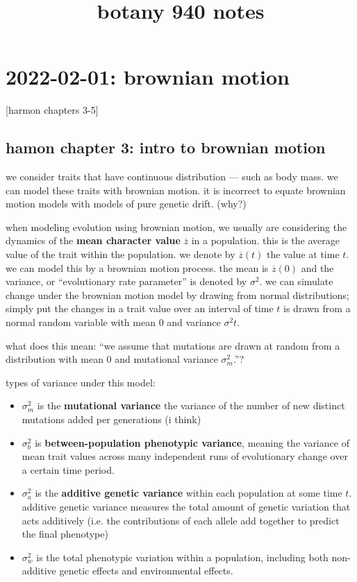 \documentclass{article}
\title{botany 940 notes}
\newcommand{\advar}{\sigma_{a}^{2}} %
\newcommand{\bvar}{\sigma_{b}^{2}}  %
\newcommand{\mvar}{\sigma_{m}^{2}}  %
\newcommand{\wvar}{\sigma_{w}^{2}}  %
\begin{document}
\maketitle

\section{2022-02-01: brownian motion}
[harmon chapters 3-5]

\subsection{hamon chapter 3: intro to brownian motion}
we consider traits that have continuous distribution --- such as body mass. we
can model these traits with brownian motion. it is incorrect to equate brownian
motion models with models of pure genetic drift. (why?)

when modeling evolution using brownian motion, we usually are considering the
dynamics of the \textbf{mean character value} $\overline{z}$ in a population.
this is the average value of the trait within the population. we denote by
$\overline{z}(t)$ the value at time $t$. we can model this by a brownian motion
process. the mean is $\overline{z}(0)$ and the variance, or ``evolutionary rate
parameter'' is denoted by $\sigma^{2}$. we can simulate change under the
brownian motion model by drawing from normal distributions; simply put the
changes in a trait value over an interval of time $t$ is drawn from a normal
random variable with mean 0 and variance $\sigma^{2}t$.


what does this mean: ``we assume that mutations are drawn at random from a
distribution with mean 0 and mutational variance $\sigma_{m}^{2}$.''?
\begin{definition}
types of variance under this model:
\begin{itemize}
  \item $\mvar$ is the \textbf{mutational variance} the variance of the number of
    new distinct mutations added per generations (i think)
  \item $\bvar$ is \textbf{between-population phenotypic variance}, meaning the
    variance of mean trait values across many independent runs of evolutionary
    change over a certain time period.
  \item $\advar$ is the \textbf{additive genetic variance} within each
    population at some time $t$. additive genetic variance measures the total
    amount of genetic variation that acts additively (i.e. the contributions of
    each allele add together to predict the final phenotype)
  \item $\wvar$ is the total phenotypic variation within a population, including
    both non-additive genetic effects and environmental effects.
\end{itemize}
\end{definition}
\end{document}
